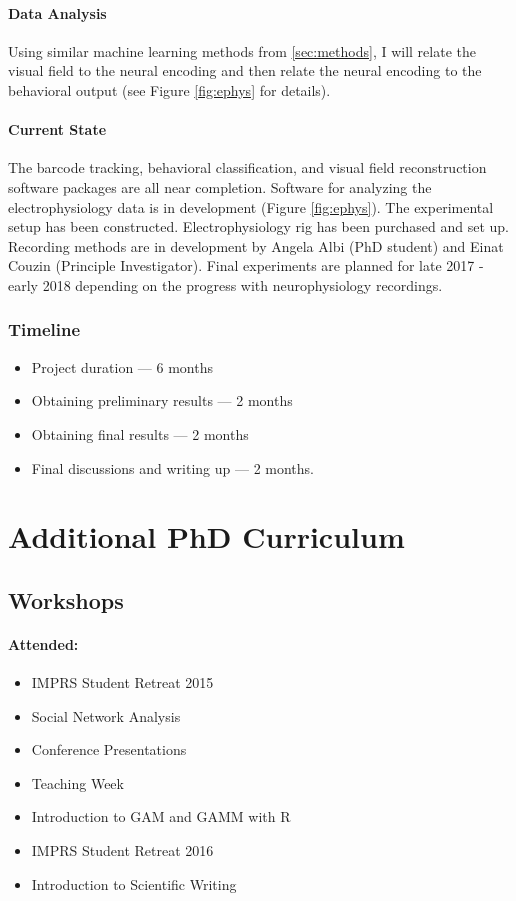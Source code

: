 \documentclass[11pt,a4paper,oneside]{article}
\begin{document}
\paragraph{Data Analysis}
Using similar machine learning methods from \ref{sec:methods}, I will relate the visual field to the neural encoding and then relate the neural encoding to the behavioral output (see Figure \ref{fig:ephys} for details).

\paragraph{Current State}
The barcode tracking, behavioral classification, and visual field reconstruction software packages are all near completion. Software for analyzing the electrophysiology data is in development (Figure \ref{fig:ephys}). The experimental setup has been constructed. Electrophysiology rig has been purchased and set up. Recording methods are in development by Angela Albi (PhD student) and Einat Couzin (Principle Investigator). Final experiments are planned for late 2017 - early 2018 depending on the progress with neurophysiology recordings.

\subsubsection{Timeline}
\begin{itemize}{}{}
	\item Project duration --- 6 months
	\item Obtaining preliminary results --- 2 months
	\item Obtaining final results --- 2 months	
	\item Final discussions and writing up --- 2 months.
\end{itemize}


\section{Additional PhD Curriculum}
\subsection{Workshops}
\paragraph{Attended:}
\begin{itemize}
	\item IMPRS Student Retreat 2015
	\item Social Network Analysis
	\item Conference Presentations
	\item Teaching Week
	\item Introduction to GAM and GAMM with R
	\item IMPRS Student Retreat 2016
	\item Introduction to Scientific Writing
\end{itemize}
\end{document}
